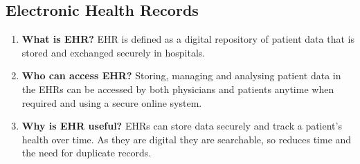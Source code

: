 \documentclass[10pt, twoside]{article}   	%
\begin{document}
\subsection{Electronic Health Records}
\begin{enumerate}
    \item \textbf{What is EHR?} EHR is defined as a digital repository of patient data that is stored and exchanged securely in hospitals. 
    \item \textbf{Who can access EHR?} Storing, managing and analysing patient data in the EHRs can be accessed by both physicians and patients anytime when required and using a secure online system.
    \item \textbf{Why is EHR useful?}  EHRs can store data securely and track a patient’s health over time. As they are digital they are searchable, so reduces time and the need for duplicate records.
\end {enumerate}
\end{document}

